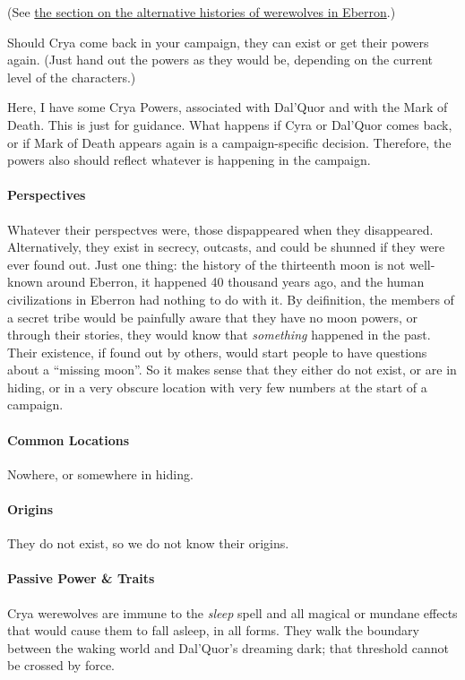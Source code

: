 \documentclass[twocolumn]{dndbook}
\begin{document}
(See \hyperref[sec:history]{the section on the alternative histories of werewolves in Eberron}.)

Should Crya come back in your campaign, they can exist or get their powers again.
(Just hand out the powers as they would be, depending on the current level of the characters.)\par

Here, I have some Crya Powers, associated with Dal'Quor and with the Mark of Death.
This is just for guidance.
What happens if Cyra or Dal'Quor comes back, or if Mark of Death appears again is a campaign-specific decision.
Therefore, the powers also should reflect whatever is happening in the campaign.\par

\paragraph*{Perspectives} Whatever their perspectves were, those dispappeared when they disappeared.
Alternatively, they exist in secrecy, outcasts, and could be shunned if they were ever found out.
Just one thing: the history of the thirteenth moon is not well-known around Eberron, it happened 40 thousand years ago, and the human civilizations in Eberron had nothing to do with it.
By deifinition, the members of a secret tribe would be painfully aware that they have no moon powers, or through their stories, they would know that \emph{something} happened in the past.
Their existence, if found out by others, would start people to have questions about a ``missing moon''.
So it makes sense that they either do not exist, or are in hiding, or in a very obscure location with very few numbers at the start of a campaign.\par

\paragraph*{Common Locations} Nowhere, or somewhere in hiding.\par

\paragraph*{Origins} They do not exist, so we do not know their origins.\par

\paragraph*{Passive Power \& Traits} Crya werewolves are immune to the \emph{sleep} spell and all magical or mundane effects that would cause them to fall asleep, in all forms.
They walk the boundary between the waking world and Dal'Quor's dreaming dark; that threshold cannot be crossed by force.\par
\end{document}
